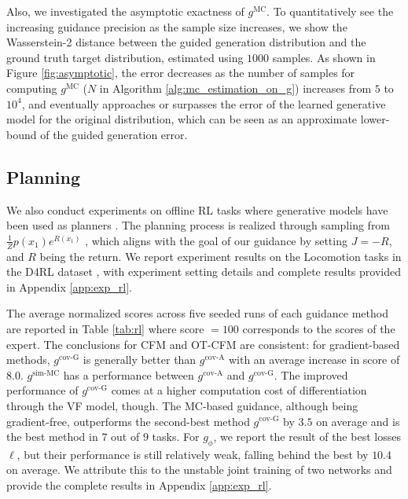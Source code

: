 Also, we investigated the asymptotic exactness of $g^{\text{MC}}$. To quantitatively see the increasing guidance precision as the sample size increases, we show the Wasserstein-2 distance between the guided generation distribution and the ground truth target distribution, estimated using $1000$ samples. As shown in Figure \ref{fig:asymptotic}, the error decreases as the number of samples for computing $g^{\text{MC}}$ ($N$ in Algorithm \ref{alg:mc_estimation_on_g}) increases from $5$ to $10^4$, and eventually approaches or surpasses the error of the learned generative model for the original distribution, which can be seen as an approximate lower-bound of the guided generation error.


\subsection{Planning}

We also conduct experiments on offline RL tasks where generative models have been used as planners \citep{janner_planning_2022,chen_flow_2024}. The planning process is realized through sampling from $\frac{1}{Z}p(x_1)e^{R(x_1)}$ \citep{levine_reinforcement_2018}, which aligns with the goal of our guidance by setting $J=-R$, and $R$ being the return.
We report experiment results on the Locomotion tasks in the D4RL dataset \citep{d4rl}, with experiment setting details and complete results provided in Appendix \ref{app:exp_rl}.



The average normalized scores across five seeded runs of each guidance method are reported in Table \ref{tab:rl} where score $=100$ corresponds to the scores of the expert. The conclusions for CFM and OT-CFM are consistent: for gradient-based methods, $g^{\text{cov-G}}$ is generally better than $g^{\text{cov-A}}$ with an average increase in score of $8.0$. $g^{\text{sim-MC}}$ has a performance between $g^{\text{cov-A}}$ and $g^{\text{cov-G}}$.
The improved performance of $g^{\text{cov-G}}$ comes at a higher computation cost of differentiation through the VF model, though. 
The MC-based guidance, although being gradient-free, outperforms the second-best method $g^{\text{cov-G}}$ by $3.5$ on average and is the best method in $7$ out of $9$ tasks.
For $g_\phi$, we report the result of the best losses $\ell$, but their performance is still relatively weak, falling behind the best by $10.4$ on average. We attribute this to the unstable joint training of two networks and provide the complete results in Appendix \ref{app:exp_rl}.

